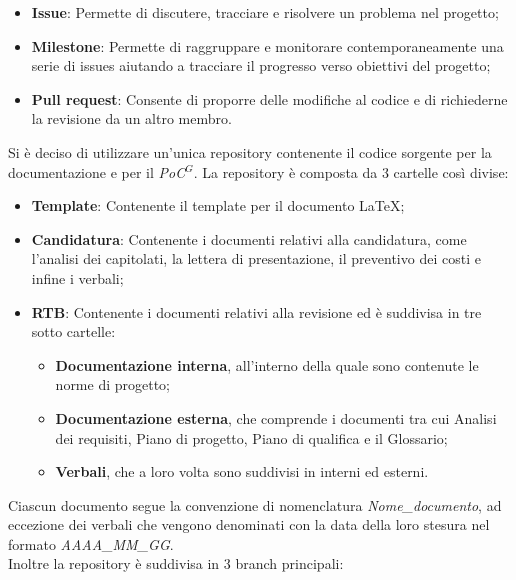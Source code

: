 \begin{itemize}
\item \textbf{Issue}: Permette di discutere, tracciare e risolvere un problema nel progetto;
\item \textbf{Milestone}: Permette di raggruppare e monitorare contemporaneamente una serie di issues aiutando a tracciare il progresso verso obiettivi del progetto;
\item \textbf{Pull request}: Consente di proporre delle modifiche al codice e di richiederne la revisione da un altro membro.
\end{itemize}
    Si è deciso di utilizzare un'unica repository contenente il codice sorgente per la documentazione e per il \emph{PoC}$^{G}$.
    La repository è composta da 3 cartelle così divise:

\begin{itemize}
\item \textbf{Template}: Contenente il template per il documento \LaTeX;
\item \textbf{Candidatura}: Contenente i documenti relativi alla candidatura, come l'analisi dei capitolati, la lettera di presentazione, il preventivo dei costi e infine i verbali;
\item \textbf{RTB}: Contenente i documenti relativi alla revisione ed è suddivisa in tre sotto cartelle:
\begin{itemize}
\item \textbf{Documentazione interna}, all'interno della quale sono contenute le norme di progetto;
\item \textbf{Documentazione esterna}, che comprende i documenti tra cui Analisi dei requisiti, Piano di progetto, Piano di qualifica e il Glossario;
\item \textbf{Verbali}, che a loro volta sono suddivisi in interni ed esterni.
\end{itemize}
\end{itemize}
    Ciascun documento segue la convenzione di nomenclatura \emph{Nome\_documento}, ad eccezione dei verbali che vengono
    denominati con la data della loro stesura nel formato \emph{AAAA\_MM\_GG}. \\
    Inoltre la repository è suddivisa in 3 branch principali:

